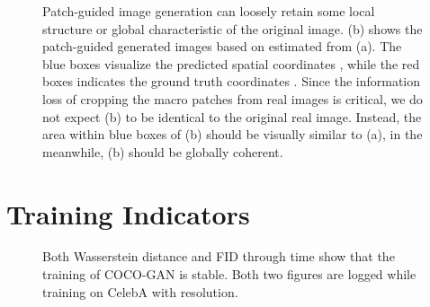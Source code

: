 \documentclass{article}
\newcommand{\modelName}{COCO-GAN }
\begin{document}
\begin{appendices}
\begin{figure}[H]
        \hfill {}
        
        \caption{Patch-guided image generation can loosely retain some local structure or global characteristic of the original image. (b) shows the patch-guided generated images based on  estimated from (a). The {\color{blue} blue} boxes visualize the predicted spatial coordinates , while the {\color{red} red} boxes indicates the ground truth coordinates . Since the information loss of cropping the macro patches from real images is critical, we do not expect (b) to be identical to the original real image. Instead, the area within blue boxes of (b) should be visually similar to (a), in the meanwhile, (b) should be globally coherent.}
    \end{figure}
    
\section{Training Indicators}
    \label{appendix:indicator-curves}
    \begin{figure}[H]
        \centering
        
        \caption{Both Wasserstein distance and FID through time show that the  training of \modelName is stable. Both two figures are logged while training on CelebA with  resolution.}
        \label{fig:indicator-curves}
    \end{figure}
    
    \vspace{1em}

\end{appendices}

 
\end{document}

